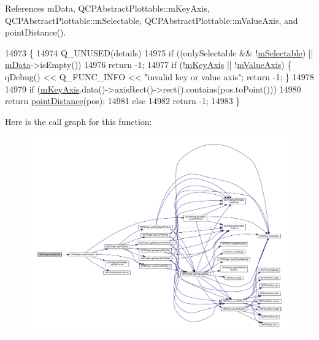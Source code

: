 References m\+Data, Q\+C\+P\+Abstract\+Plottable\+::m\+Key\+Axis, Q\+C\+P\+Abstract\+Plottable\+::m\+Selectable, Q\+C\+P\+Abstract\+Plottable\+::m\+Value\+Axis, and point\+Distance().


\begin{DoxyCode}
14973 \{
14974   Q\_UNUSED(details)
14975   if ((onlySelectable && !\hyperlink{class_q_c_p_abstract_plottable_aceee52342c8e75727abcbd164986fdcb}{mSelectable}) || \hyperlink{class_q_c_p_graph_a8457c840f69a0ac49f61d30a509c5d08}{mData}->isEmpty())
14976     return -1;
14977   if (!\hyperlink{class_q_c_p_abstract_plottable_a426f42e254d0f8ce5436a868c61a6827}{mKeyAxis} || !\hyperlink{class_q_c_p_abstract_plottable_a2901452ca4aea911a1827717934a4bda}{mValueAxis}) \{ qDebug() << Q\_FUNC\_INFO << \textcolor{stringliteral}{"invalid key or value axis"};
       \textcolor{keywordflow}{return} -1; \}
14978   
14979   \textcolor{keywordflow}{if} (\hyperlink{class_q_c_p_abstract_plottable_a426f42e254d0f8ce5436a868c61a6827}{mKeyAxis}.data()->axisRect()->rect().contains(pos.toPoint()))
14980     \textcolor{keywordflow}{return} \hyperlink{class_q_c_p_graph_af93762a12a481a7edb4b3dd9e330dff1}{pointDistance}(pos);
14981   \textcolor{keywordflow}{else}
14982     \textcolor{keywordflow}{return} -1;
14983 \}
\end{DoxyCode}


Here is the call graph for this function\+:\nopagebreak
\begin{figure}[H]
\begin{center}
\leavevmode
\includegraphics[width=350pt]{class_q_c_p_graph_abc9ff375aabcf2d21cca33d6baf85772_cgraph}
\end{center}
\end{figure}


